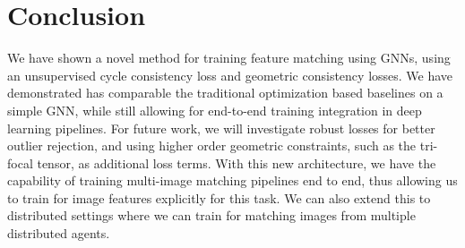 \documentclass[10pt,twocolumn,letterpaper]{article}
\begin{document}
\section{Conclusion}

We have shown a novel method for training feature matching using GNNs, using an unsupervised cycle consistency loss and geometric consistency losses.
We have demonstrated has comparable the traditional optimization based baselines on a simple GNN, while still allowing for end-to-end training integration in deep learning pipelines.
For future work, we will investigate robust losses for better outlier rejection, and using higher order geometric constraints, such as the tri-focal tensor, as additional loss terms.
With this new architecture, we have the capability of training multi-image matching pipelines end to end, thus allowing us to train for image features explicitly for this task.
We can also extend this to distributed settings where we can train for matching images from multiple distributed agents. 

% 
{\small


}
\end{document}

